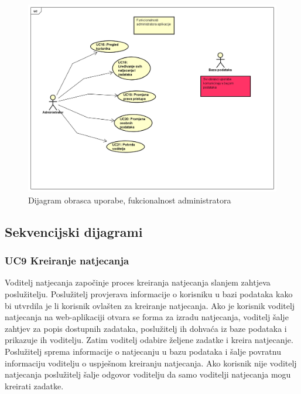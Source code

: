					\eject
					
					\begin{figure}[H]
						\includegraphics[scale=0.5]{slike/Administrator.PNG} %
						\centering
						\caption{Dijagram obrasca uporabe, fukcionalnost administratora}
						\label{fig:obrasci2}
					\end{figure}
				\eject		

			\subsection{Sekvencijski dijagrami}

				\vspace{10mm}
				\subsubsection*{UC9 Kreiranje natjecanja}
				
				Voditelj natjecanja započinje proces kreiranja natjecanja slanjem zahtjeva poslužitelju. Poslužitelj provjerava informacije o korisniku u bazi podataka kako bi utvrdila je li korisnik ovlašten za kreiranje natjecanja. Ako je korisnik voditelj natjecanja na web-aplikaciji otvara se forma za izradu natjecanja, voditelj šalje zahtjev za popis dostupnih zadataka, poslužitelj ih dohvaća iz baze podataka i prikazuje ih voditelju. Zatim voditelj odabire željene zadatke i kreira natjecanje. Poslužitelj sprema informacije o natjecanju u bazu podataka i šalje povratnu informaciju voditelju o uspješnom kreiranju natjecanja. Ako korisnik nije voditelj natjecanja poslužitelj šalje odgovor voditelju da samo voditelji natjecanja mogu kreirati zadatke.
				\vspace{20mm}

